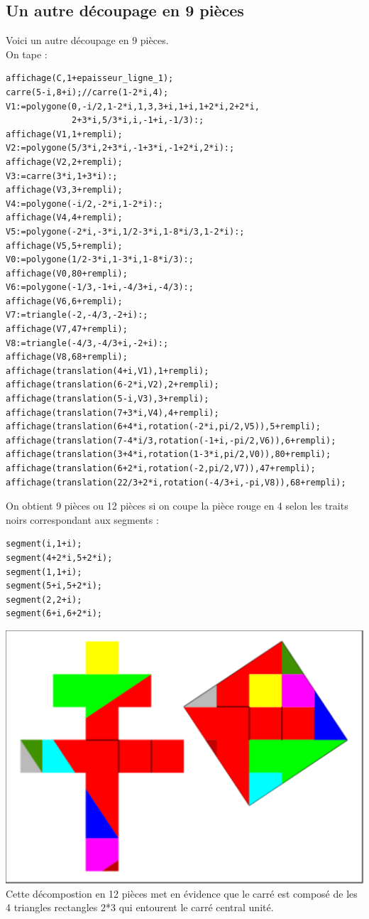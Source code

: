 \documentclass[a4paper,11pt]{book}
\begin{document}
\subsection{Un autre d\'ecoupage en 9 pi\`eces}
Voici un autre d\'ecoupage en 9 pi\`eces.\\
On tape :
\begin{verbatim}
affichage(C,1+epaisseur_ligne_1);
carre(5-i,8+i);//carre(1-2*i,4);
V1:=polygone(0,-i/2,1-2*i,1,3,3+i,1+i,1+2*i,2+2*i,
             2+3*i,5/3*i,i,-1+i,-1/3):;
affichage(V1,1+rempli);
V2:=polygone(5/3*i,2+3*i,-1+3*i,-1+2*i,2*i):;
affichage(V2,2+rempli);
V3:=carre(3*i,1+3*i):;
affichage(V3,3+rempli);
V4:=polygone(-i/2,-2*i,1-2*i):;
affichage(V4,4+rempli);
V5:=polygone(-2*i,-3*i,1/2-3*i,1-8*i/3,1-2*i):;
affichage(V5,5+rempli);
V0:=polygone(1/2-3*i,1-3*i,1-8*i/3):;
affichage(V0,80+rempli);
V6:=polygone(-1/3,-1+i,-4/3+i,-4/3):;
affichage(V6,6+rempli);
V7:=triangle(-2,-4/3,-2+i):;
affichage(V7,47+rempli);
V8:=triangle(-4/3,-4/3+i,-2+i):;
affichage(V8,68+rempli);
affichage(translation(4+i,V1),1+rempli);
affichage(translation(6-2*i,V2),2+rempli);
affichage(translation(5-i,V3),3+rempli);
affichage(translation(7+3*i,V4),4+rempli);
affichage(translation(6+4*i,rotation(-2*i,pi/2,V5)),5+rempli);
affichage(translation(7-4*i/3,rotation(-1+i,-pi/2,V6)),6+rempli);
affichage(translation(3+4*i,rotation(1-3*i,pi/2,V0)),80+rempli);
affichage(translation(6+2*i,rotation(-2,pi/2,V7)),47+rempli);
affichage(translation(22/3+2*i,rotation(-4/3+i,-pi,V8)),68+rempli);
\end{verbatim}
On obtient 9 pi\`eces ou 12 pi\`eces si on coupe la pi\`ece rouge en 4 selon 
les traits noirs correspondant aux segments :\\
\begin{verbatim}
segment(i,1+i);
segment(4+2*i,5+2*i);
segment(1,1+i);
segment(5+i,5+2*i);
segment(2,2+i);
segment(6+i,6+2*i);
\end{verbatim}
\includegraphics[width=\textwidth]{puzzlecroix13}\\
Cette d\'ecompostion en 12 pi\`eces met en \'evidence que le carr\'e est
compos\'e de les 4 triangles rectangles 2*3 qui entourent le carr\'e central
unit\'e.\\
\end{document}
